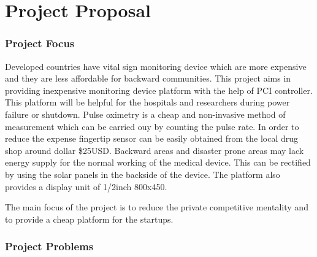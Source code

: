 
\chapter{Project Proposal} \label{chapter:firstchapter} %

\label{ChapterX} %







\subsection{Project Focus}


Developed countries have vital sign monitoring device which are more expensive and they are less affordable for backward communities. 
This project aims in providing inexpensive monitoring device platform with the help of PCI controller. This platform will be helpful for the hospitals and researchers during power failure or shutdown.
Pulse oximetry is a cheap and non-invasive method of measurement which can be carried ouy by counting the pulse rate. In order to reduce the expense fingertip sensor can be easily obtained from the local drug shop around dollar \$25USD.\cite{HACKADAY}
Backward areas and disaster prone areas may lack energy supply for the normal working of the medical device. This can be rectified by using the solar panels in the backside of the device. The platform also provides a display unit of 1/2inch 800x450.

The main focus of the project is to reduce the private competitive mentality and to provide a cheap platform for the startups.
 


\subsection{Project Problems}

